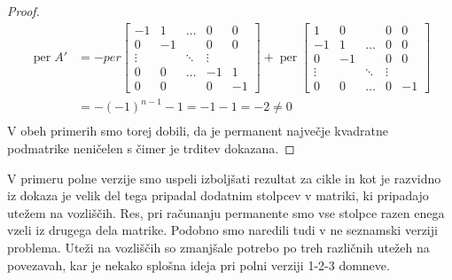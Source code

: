 \documentclass[12pt,a4paper,twoside]{article}
\theoremstyle{definition} %
\theoremstyle{plain} %
\numberwithin{equation}{section}  %
\DeclareMathOperator{\per}{per}
\begin{document}
\begin{proof}
\begin{equation*}
\begin{split}
 \per A' &=-per\left[
\begin{matrix} 
 -1 & 1 & \ldots & 0 & 0 \\ 
 0 & -1 &  & 0 & 0 \\ 
 \vdots &  & \ddots & \vdots &  \\ 
 0 & 0 & \ldots & -1 & 1 \\
 0 & 0 &  & 0 & -1 
\end{matrix} \right]
+\per\left[
\begin{matrix} 
 1 & 0 &  & 0 & 0 \\
 -1 & 1 & \ldots & 0 & 0 \\  0 & -1 &  & 0 & 0 \\ 
  \vdots &  & \ddots & \vdots &  \\ 
 0 & 0 & \ldots & 0 & -1
\end{matrix} \right] \\
&=-(-1)^{n-1} -1 =  -1 - 1 = -2 \neq 0\\
\end{split}
\end{equation*}
V obeh primerih smo torej dobili, da je permanent največje kvadratne podmatrike neničelen s čimer je trditev dokazana.
\end{proof}
V primeru polne verzije smo uspeli izboljšati rezultat za cikle in kot je razvidno iz dokaza je velik del tega pripadal dodatnim stolpcev v matriki, ki pripadajo utežem na vozliščih. Res, pri računanju permanente smo vse stolpce razen enega vzeli iz drugega dela matrike. Podobno smo naredili tudi v ne seznamski verziji problema. Uteži na vozliščih so zmanjšale potrebo po treh različnih utežeh na povezavah, kar je nekako splošna ideja pri polni verziji 1-2-3 domneve.
\end{document}
